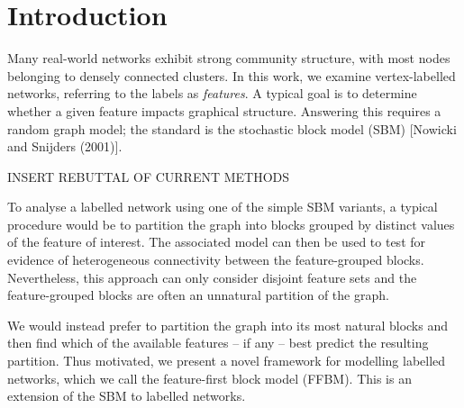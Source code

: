 \section{Introduction}

Many real-world networks exhibit strong community structure, with most nodes belonging to densely connected clusters. 
In this work, we examine vertex-labelled networks, 
referring to the labels as {\em features}. A typical goal is to determine whether a given feature impacts graphical structure. Answering this requires a random graph model;
the standard is the stochastic block model (SBM) [Nowicki and Snijders (2001)].

INSERT REBUTTAL OF CURRENT METHODS

To analyse a labelled network using one of the simple SBM variants, a typical procedure would be to partition the graph into blocks grouped by distinct values of the feature of interest. The associated model can then be used to test for evidence of heterogeneous connectivity between the feature-grouped blocks. Nevertheless, this approach can only consider disjoint feature sets and the feature-grouped blocks are often an unnatural partition of the graph.

We would instead prefer to partition the graph into its most natural blocks and then find which of the available features -- if any -- best predict the resulting partition. Thus motivated, we present a novel framework for modelling labelled networks, which we call the feature-first block model (FFBM). This is an extension of the SBM to labelled networks.
